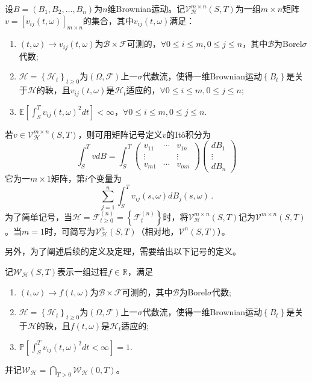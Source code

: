 \documentclass[oneside]{sysuthesis}
\begin{document}
\begin{definition}\label{def:multi_Ito_int}
	设$B=(B_1,B_2,\ldots,B_n)$为$n$维Brownian运动。记$\mathcal{V}_{\mathcal{H}}^{m\times n}(S,T)$为一组$m\times n$矩阵$v=[v_{ij}(t,\omega)]_{m\times n}$的集合，其中$v_{ij}(t,\omega)$满足：
	\begin{enumerate}[label=(\arabic*)]
		\item $(t,\omega)\to v_{ij}(t,\omega)$为$\mathcal{B}\times\mathcal{F}$可测的，$\forall 0\le i\le m,0\le j\le n$，其中$\mathcal{B}$为Borel$\sigma$代数;
		\item $\mathcal{H}=\left\{\mathcal{H}_t\right\}_{t\ge 0}$为$(\Omega,\mathcal{F})$上一$\sigma$代数流，使得一维Brownian运动$\left\{B_t\right\}$是关于$\mathcal{H}$的鞅，且$v_{ij}(t,\omega)$是$\mathcal{H}_t$适应的，$\forall 0\le i\le m,0\le j\le n$;
		\item $\mathbb{E}\left[ \int_{S}^{T}v_{ij}(t,\omega)^2 dt\right]<\infty$，$\forall 0\le i\le m,0\le j\le n$.
	\end{enumerate}
	若$v\in\mathcal{V}_{\mathcal{H}}^{m\times n}(S,T)$，则可用矩阵记号定义$v$的It\^o积分为
	\[
	\int_{S}^{T}vdB=\int_{S}^{T}
	\begin{pmatrix}
		v_{11} &\cdots & v_{1n} \\
		\vdots & &\vdots \\
		v_{m1} &\cdots & v_{mn}
	\end{pmatrix}
	\begin{pmatrix}
		dB_1 \\
		\vdots \\
		dB_n
	\end{pmatrix}
	\]
	它为一$m\times 1$矩阵，第$i$个变量为
	\[
	\sum_{j=1}^{n}\int_{S}^{T}v_{ij}(s,\omega)dB_j(s,\omega)\,.
	\]
	\hspace*{2em}为了简单记号，当$\mathcal{H}=\mathcal{F}^{(n)}_{t\ge 0}=\left\{\mathcal{F}_t^{(n)}\right\}$时，将$\mathcal{V}_{\mathcal{H}}^{m\times n}(S,T)$记为$\mathcal{V}^{m\times n}(S,T)$。当$m=1$时，可简写为$\mathcal{V}_{\mathcal{H}}^n(S,T)$（相对地，$\mathcal{V}^n(S,T)$）。
\end{definition}

另外，为了阐述后续的定义及定理，需要给出以下记号的定义。

\begin{definition}\label{def:W_family}
	记$\mathcal{W}_{\mathcal{H}}(S,T)$表示一组过程$f\in\mathbb{R}$，满足
	\begin{enumerate}[label=(\arabic*)]
		\item $(t,\omega)\to f(t,\omega)$为$\mathcal{B}\times\mathcal{F}$可测的，其中$\mathcal{B}$为Borel$\sigma$代数;
		\item $\mathcal{H}=\left\{\mathcal{H}_t\right\}_{t\ge 0}$为$(\Omega,\mathcal{F})$上一$\sigma$代数流，使得一维Brownian运动$\left\{B_t\right\}$是关于$\mathcal{H}$的鞅，且$f(t,\omega)$是$\mathcal{H}_t$适应的;
		\item $\mathbb{P}\left[ \int_{S}^{T}v_{ij}(t,\omega)^2 dt <\infty\right]=1$.
	\end{enumerate}
	\noindent 并记$\mathcal{W}_{\mathcal{H}}=\bigcap_{T>0}\mathcal{W}_{\mathcal{H}}(0,T)$。
\end{definition}
\end{document}
